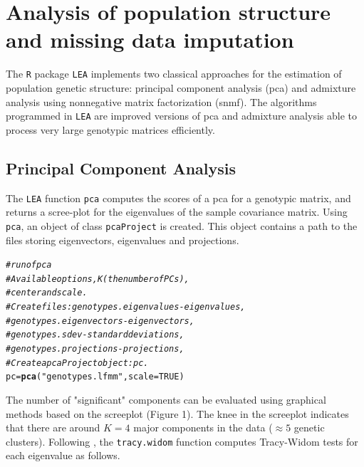 \documentclass[12pt,a4paper,oneside]{article}\usepackage[]{graphicx}\usepackage[]{color}
\makeatletter
\newcommand{\hlnum}[1]{\textcolor[rgb]{0.686,0.059,0.569}{#1}}%
\newcommand{\hlstr}[1]{\textcolor[rgb]{0.192,0.494,0.8}{#1}}%
\newcommand{\hlcom}[1]{\textcolor[rgb]{0.678,0.584,0.686}{\textit{#1}}}%
\newcommand{\hlstd}[1]{\textcolor[rgb]{0.345,0.345,0.345}{#1}}%
\newcommand{\hlkwb}[1]{\textcolor[rgb]{0.69,0.353,0.396}{#1}}%
\newcommand{\hlkwc}[1]{\textcolor[rgb]{0.333,0.667,0.333}{#1}}%
\newcommand{\hlkwd}[1]{\textcolor[rgb]{0.737,0.353,0.396}{\textbf{#1}}}%
\newenvironment{kframe}{%
 \def\at@end@of@kframe{}%
 \ifinner\ifhmode%
  \def\at@end@of@kframe{\end{minipage}}%
  \begin{minipage}{\columnwidth}%
 \fi\fi%
 \def\FrameCommand##1{\hskip\@totalleftmargin \hskip-\fboxsep
 \colorbox{shadecolor}{##1}\hskip-\fboxsep
     \hskip-\linewidth \hskip-\@totalleftmargin \hskip\columnwidth}%
 \MakeFramed {\advance\hsize-\width
   \@totalleftmargin\z@ \linewidth\hsize
   \@setminipage}}%
 {\par\unskip\endMakeFramed%
 \at@end@of@kframe}
\newenvironment{knitrout}{}{} %
\makeatother
\begin{document}
\section{Analysis of population structure and missing data imputation}

The {\tt R} package {\tt LEA} implements two classical approaches for the estimation of population genetic structure: principal component analysis (pca) and admixture analysis \citep{Patterson_2006, Pritchard_2000a} using nonnegative matrix factorization (snmf). The algorithms programmed in {\tt LEA} are improved versions of pca and admixture analysis able to process very large genotypic matrices efficiently.

\subsection{Principal Component Analysis}

The {\tt LEA} function {\tt pca} computes the scores of a pca for a genotypic matrix, and returns a scree-plot for the eigenvalues of the sample covariance matrix. Using {\tt pca}, an object of class {\tt pcaProject} is created. This object contains a path to the files storing eigenvectors, eigenvalues and projections. 

\begin{knitrout}
\color{fgcolor}\begin{kframe}
\begin{alltt}
\hlcom{# run of pca}
\hlcom{# Available options, K (the number of PCs), }
\hlcom{#                    center and scale. }
\hlcom{# Create files: genotypes.eigenvalues - eigenvalues,        }
\hlcom{#               genotypes.eigenvectors - eigenvectors,}
\hlcom{#               genotypes.sdev - standard deviations,}
\hlcom{#               genotypes.projections - projections,}
\hlcom{# Create a pcaProject object: pc.}
\hlstd{pc} \hlkwb{=} \hlkwd{pca}\hlstd{(}\hlstr{"genotypes.lfmm"}\hlstd{,} \hlkwc{scale} \hlstd{=} \hlnum{TRUE}\hlstd{)}
\end{alltt}
\end{kframe}
\end{knitrout}
\noindent
The number of "significant" components can be evaluated using graphical methods based on the screeplot (Figure 1). The knee in the screeplot indicates that there
are around $K = 4$ major components in the data ($\approx 5$ genetic clusters). 
Following  \citep{Patterson_2006}, the {\tt tracy.widom} function computes Tracy-Widom tests for each eigenvalue as follows.
\end{document}
